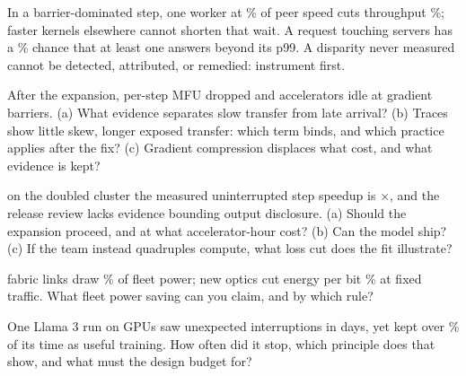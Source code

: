 \documentclass{studysheet}
\begin{document}
\begin{rightcol}
%
  {In a barrier-dominated step, one worker at \% of peer speed cuts throughput
   \%; faster kernels elsewhere cannot shorten that wait.}{}
%
  {A request touching  servers has a \% chance that at least one answers
   beyond its p99.}{}
%
  {A disparity never measured cannot be detected, attributed, or remedied: instrument first.}{}

\vspace{2pt}
\begin{qs}
\item After the expansion, per-step MFU dropped and accelerators idle at gradient barriers. (a) What
  evidence separates slow transfer from late arrival? (b) Traces show little skew, longer exposed transfer:
  which term binds, and which practice applies after the fix? (c) Gradient compression displaces what cost, and what evidence is kept?
\item \assumed{} on the doubled cluster the measured uninterrupted step speedup is $\times$, and the
  release review lacks evidence bounding output disclosure. (a) Should the expansion proceed, and at what
  accelerator-hour cost? (b) Can the model ship? (c) If the team instead quadruples compute, what loss cut
  does the fit illustrate?
\item \assumed{} fabric links draw \% of fleet power; new optics cut energy per bit
  \% at fixed traffic. What fleet power saving can you claim, and by which rule?
\item One Llama 3 run on  GPUs saw  unexpected interruptions in
   days, yet kept over \% of its time as useful training. How often did it stop, which
  principle does that show, and what must the design budget for?
\end{qs}
\end{rightcol}
\end{document}
